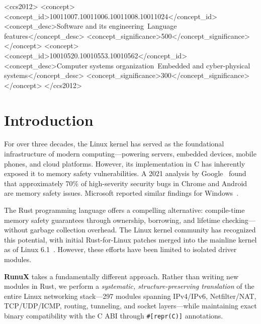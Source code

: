 \documentclass[sigconf,nonacm=false]{acmart}
\begin{document}
\begin{CCSXML}
<ccs2012>
<concept>
<concept_id>10011007.10011006.10011008.10011024</concept_id>
<concept_desc>Software and its engineering~Language features</concept_desc>
<concept_significance>500</concept_significance>
</concept>
<concept>
<concept_id>10010520.10010553.10010562</concept_id>
<concept_desc>Computer systems organization~Embedded and cyber-physical systems</concept_desc>
<concept_significance>300</concept_significance>
</concept>
</ccs2012>
\end{CCSXML}



\maketitle

\section{Introduction}
\label{sec:intro}

For over three decades, the Linux kernel has served as the foundational infrastructure of modern computing---powering servers, embedded devices, mobile phones, and cloud platforms. However, its implementation in C has inherently exposed it to memory safety vulnerabilities. A 2021 analysis by Google~\cite{ArmMemSafety2021} found that approximately 70\% of high-severity security bugs in Chrome and Android are memory safety issues. Microsoft reported similar findings for Windows~\cite{MSRCMemSafety2019}.

The Rust programming language offers a compelling alternative: compile-time memory safety guarantees through ownership, borrowing, and lifetime checking---without garbage collection overhead. The Linux kernel community has recognized this potential, with initial Rust-for-Linux patches merged into the mainline kernel as of Linux 6.1~\cite{RustForLinux2022}. However, these efforts have been limited to isolated driver modules.

\textbf{RunuX} takes a fundamentally different approach. Rather than writing new modules in Rust, we perform a \emph{systematic, structure-preserving translation} of the entire Linux networking stack---297 modules spanning IPv4/IPv6, Netfilter/NAT, TCP/UDP/ICMP, routing, tunneling, and socket layers---while maintaining exact binary compatibility with the C ABI through \texttt{\#[repr(C)]} annotations.
\end{document}
